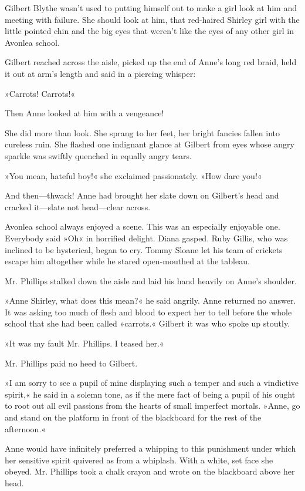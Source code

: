 Gilbert Blythe wasn't used to putting himself out to make a girl look at him and meeting with failure. She should look at him, that red-haired Shirley girl with the little pointed chin and the big eyes that weren't like the eyes of any other girl in Avonlea school.

Gilbert reached across the aisle, picked up the end of Anne's long red braid, held it out at arm's length and said in a piercing whisper:

»Carrots! Carrots!«

Then Anne looked at him with a vengeance!

She did more than look. She sprang to her feet, her bright fancies fallen into cureless ruin. She flashed one indignant glance at Gilbert from eyes whose angry sparkle was swiftly quenched in equally angry tears.

»You mean, hateful boy!« she exclaimed passionately. »How dare you!«

And then—thwack! Anne had brought her slate down on Gilbert's head and cracked it—slate not head—clear across.

Avonlea school always enjoyed a scene. This was an especially enjoyable one. Everybody said »Oh« in horrified delight. Diana gasped. Ruby Gillis, who was inclined to be hysterical, began to cry. Tommy Sloane let his team of crickets escape him altogether while he stared open-mouthed at the tableau.

Mr. Phillips stalked down the aisle and laid his hand heavily on Anne's shoulder.

»Anne Shirley, what does this mean?« he said angrily. Anne returned no answer. It was asking too much of flesh and blood to expect her to tell before the whole school that she had been called »carrots.« Gilbert it was who spoke up stoutly.

»It was my fault Mr. Phillips. I teased her.«

Mr. Phillips paid no heed to Gilbert.

»I am sorry to see a pupil of mine displaying such a temper and such a vindictive spirit,« he said in a solemn tone, as if the mere fact of being a pupil of his ought to root out all evil passions from the hearts of small imperfect mortals. »Anne, go and stand on the platform in front of the blackboard for the rest of the afternoon.«

Anne would have infinitely preferred a whipping to this punishment under which her sensitive spirit quivered as from a whiplash. With a white, set face she obeyed. Mr. Phillips took a chalk crayon and wrote on the blackboard above her head.

